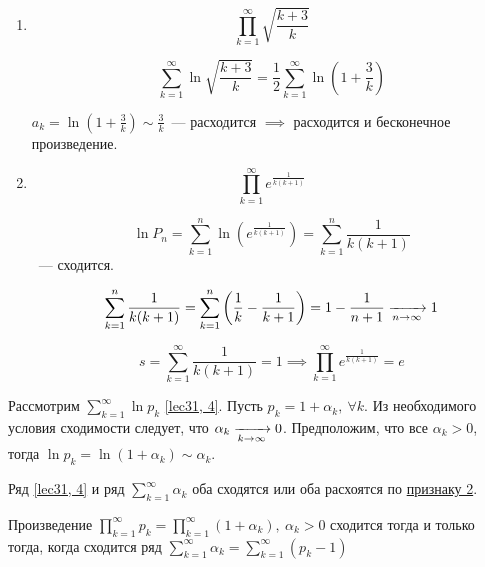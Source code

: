 \documentclass[../../main.tex]{subfiles}
\begin{document}
	\begin{example}
		\begin{enumerate}[label=\arabic*)]
			\item \[\prod\limits_{k = 1}^{\infty} \sqrt{\frac{k + 3}{k}}\]
			
			\[\sum\limits_{k = 1}^{\infty} \ln \sqrt{\frac{k + 3}{k}} = \frac{1}{2} 
			\sum\limits_{k = 1}^{\infty} \ln\left(1 + \frac{3}{k}\right) \]
			
			$a_k = \ln \left(1 + \frac{3}{k}\right) \sim \frac{3}{k}$~--- расходится 
			$\implies$ расходится и бесконечное произведение.
			
			\item \[\prod\limits_{k = 1}^{\infty} e^{\frac{1}{k(k + 1)}} \]
			
			\[\ln P_n = \sum\limits_{k = 1}^{n} \ln \left(e^{\frac{1}{k(k + 1)}}\right) 
			= \sum\limits_{k = 1}^{n} \frac{1}{k(k + 1)}\]~--- сходится.
			
			\[\sum\limits_{k = 1}^{n} \frac{1}{k(k + 1)} = \sum\limits_{k = 1}^{n} 
			\left(\frac{1}{k} - \frac{1}{k + 1} \right) = 1 - \frac{1}{n + 1} \xrightarrow[n 
			\to \infty]{} 1 \]
			
			\[s = \sum\limits_{k = 1}^{\infty} \frac{1}{k(k + 1)} = 1 \implies 
			\prod\limits_{k = 1}^{\infty} e^{\frac{1}{k(k + 1)}} = e\]
		\end{enumerate}
	\end{example}

	Рассмотрим $\sum\limits_{k = 1}^{\infty} \ln p_k$ \eqref{lec31, 4}. Пусть 
	$p_k = 1 + \alpha_k,\ \forall k$. Из необходимого условия сходимости следует, 
	что $\alpha_k \xrightarrow[k \to \infty]{} 0$. Предположим, что все $\alpha_k > 0$, 
	тогда $\ln p_k = \ln (1 + \alpha_k) \sim \alpha_k$.
	
	Ряд \eqref{lec31, 4} и ряд $\sum\limits_{k = 1}^{\infty} \alpha_k$ оба 
	сходятся или оба расхоятся по \hyperref[lec26:comp_test_2]{признаку 
	2\textdegree}.
	
	\begin{thm}\label{lec31:thm2} 
		Произведение $\prod\limits_{k = 1}^{\infty} p_k = \prod\limits_{k = 
		1}^{\infty}(1 + \alpha_k),\ \alpha_k > 0$ сходится тогда и только тогда, 
		когда сходится ряд $\sum\limits_{k = 1}^{\infty} \alpha_k = \sum\limits_{k = 
		1}^{\infty} (p_k - 1)$
	\end{thm}		
\end{document}
